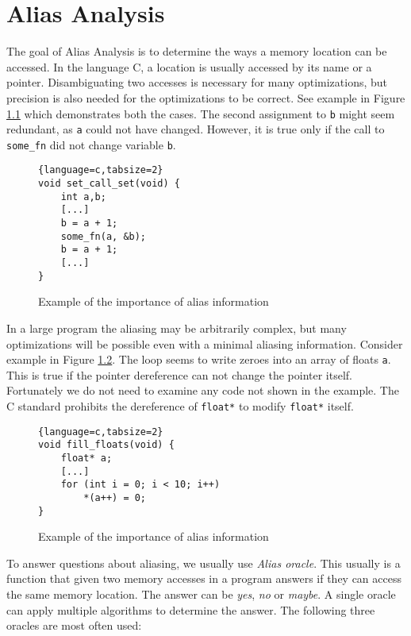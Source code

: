 \chapter{Alias Analysis}

The goal of Alias Analysis is to determine the ways a memory location can be
accessed. In the language C, a location is usually accessed by its name or a
pointer. Disambiguating two accesses is necessary for many optimizations, but
precision is also needed for the optimizations to be correct. See example in
Figure \ref{alias-example1} which demonstrates both the cases. The second
assignment to {\tt b} might seem redundant, as {\tt a} could not have changed.
However, it is true only if the call to {\tt some\_fn} did not change variable
{\tt b}. 

\begin{figure}[h!]
	\label{alias-example1}
\begin{tcolorbox}
\begin{lstlisting}{language=c,tabsize=2}
void set_call_set(void) {
	int a,b;
	[...]
	b = a + 1;
	some_fn(a, &b);
	b = a + 1;
	[...]
}
\end{lstlisting}
\end{tcolorbox}
	\caption{Example of the importance of alias information}
\end{figure}

In a large program the aliasing may be arbitrarily complex, but many
optimizations will be possible even with a minimal aliasing information.
Consider example in Figure \ref{alias-example2}. The loop seems to write zeroes
into an array of floats {\tt a}. This is true if the pointer dereference can not
change the pointer itself. Fortunately we do not need to examine any code not
shown in the example. The C standard prohibits the dereference of {\tt float*}
to modify {\tt float*} itself.

\begin{figure}[h!]
	\label{alias-example2}
\begin{tcolorbox}
\begin{lstlisting}{language=c,tabsize=2}
void fill_floats(void) {
	float* a;
	[...]
	for (int i = 0; i < 10; i++)
		*(a++) = 0;
}
\end{lstlisting}
\end{tcolorbox}
	\caption{Example of the importance of alias information}
\end{figure}

To answer questions about aliasing, we usually use {\it Alias oracle}.
This usually is a function that given two memory accesses in a program
answers if they can access the same memory location. The answer can be {\it
yes}, {\it no} or {\it maybe}. A single oracle can apply multiple algorithms to
determine the answer. The following three oracles are most often used:


